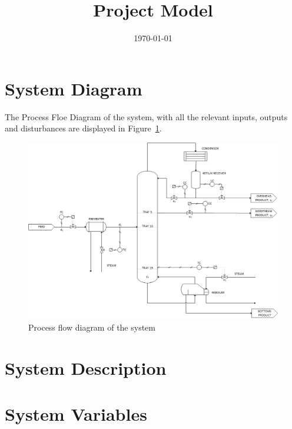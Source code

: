 \documentclass[a4paper,12pt]{article}
\title{Project Model}
\date{\today}
\begin{document}
\section{System Diagram}

The Process Floe Diagram of the system, with all the relevant inputs, outputs and disturbances are displayed in Figure~\ref{fig:processpfd}.

\begin{figure}[tbph]
	\centering
	\label{fig:processpfd}
	\includegraphics[width=0.9\linewidth]{../Process_PFD}
	\caption{Process flow diagram of the system}
\end{figure}

\newpage
\section{System Description}

\newpage
\section{System Variables}
\end{document}
